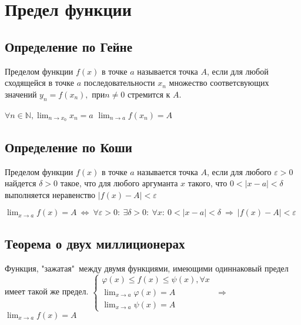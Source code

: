 \chapter{Предел функции}
\section{Определение по Гейне}
Пределом функции $f(x)$ в точке $a$ называется точка $A$, если для любой сходящейся в точке $a$ последовательности $x_n$ множество соответсвующих значений $y_n = f(x_n),$ при$ n \neq 0$ стремится к $A$.\newline

$\displaystyle \forall n \in \mathbb{N}, \lim_{n \to x_0} x_n = a$ \newline
$\displaystyle \lim_{n \to a} f(x_n) = A$

\section{Определение по Коши}
Пределом функции $f(x)$ в точке $a$ называется точка $A$, если для любого $\varepsilon > 0$ найдется $\delta > 0$ такое, что для любого аргуманта $x$ такого, что $0 < |x - a|<\delta$ выполняется неравенство $|f(x) - A| < \varepsilon$ \newline

$\displaystyle \lim_{x \to a} f(x) = A \ \Leftrightarrow \ \forall \varepsilon > 0 : \ \exists \delta > 0: \ \forall x : \ 0 < |x - a| < \delta \ \Rightarrow \ |f(x) - A| < \varepsilon $\newline

\section{Теорема о двух миллиционерах}
Функция, "зажатая"\ между двумя функциями, имеющими одиннаковый предел имеет такой же предел.\newline
$\begin{cases}\varphi(x) \leq f(x) \leq \psi(x), \forall x \\ \displaystyle \lim_{x \to a} \varphi(x) = A
\\ \displaystyle \lim_{x \to a} \psi(x) = A\end{cases}$ $\Longrightarrow$ \qquad $\displaystyle \lim_{x \to a} f(x) = A$\newline\newline

